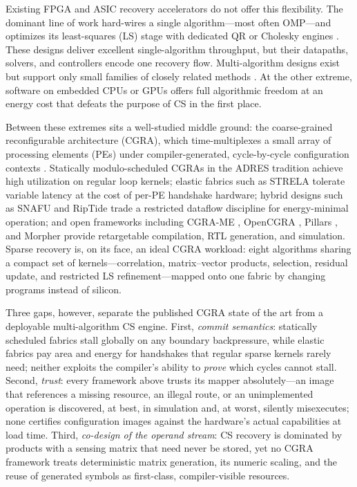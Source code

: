 Existing FPGA and ASIC recovery accelerators do not offer this flexibility.
The dominant line of work hard-wires a single algorithm---most often
OMP---and optimizes its least-squares (LS) stage with dedicated QR or
Cholesky engines \cite{ge2019qr_omp, roy2020ge_omp}. These designs deliver
excellent single-algorithm throughput, but their datapaths, solvers, and
controllers encode one recovery flow. Multi-algorithm designs exist but
support only small families of closely related methods \cite{bai2012omp_amp}.
At the other extreme, software on embedded CPUs or GPUs offers full
algorithmic freedom at an energy cost that defeats the purpose of CS in the
first place.

Between these extremes sits a well-studied middle ground: the coarse-grained
reconfigurable architecture (CGRA), which time-multiplexes a small array of
processing elements (PEs) under compiler-generated, cycle-by-cycle
configuration contexts \cite{liu2019cgra_survey}. Statically
modulo-scheduled CGRAs in the ADRES tradition \cite{mei2003adres} achieve
high utilization on regular loop kernels; elastic fabrics such as STRELA
\cite{strela2024} tolerate variable latency at the cost of per-PE handshake
hardware; hybrid designs such as SNAFU \cite{gobieski2021snafu} and RipTide
\cite{gobieski2022riptide} trade a restricted dataflow discipline for
energy-minimal operation; and open frameworks including CGRA-ME
\cite{ragheb2024cgrame2}, OpenCGRA \cite{tan2020opencgra}, Pillars
\cite{guo2020pillars}, and Morpher \cite{wijerathne2022morpher,
karunaratne2017hycube} provide retargetable compilation, RTL generation, and
simulation. Sparse recovery is, on its face, an ideal CGRA workload: eight
algorithms sharing a compact set of kernels---correlation, matrix--vector
products, selection, residual update, and restricted LS refinement---mapped
onto one fabric by changing programs instead of silicon.

Three gaps, however, separate the published CGRA state of the art from a
deployable multi-algorithm CS engine. First, \emph{commit semantics}:
statically scheduled fabrics stall globally on any boundary backpressure,
while elastic fabrics pay area and energy for handshakes that regular sparse
kernels rarely need; neither exploits the compiler's ability to \emph{prove}
which cycles cannot stall. Second, \emph{trust}: every framework above trusts
its mapper absolutely---an image that references a missing resource, an
illegal route, or an unimplemented operation is discovered, at best, in
simulation and, at worst, silently misexecutes; none certifies configuration
images against the hardware's actual capabilities at load time. Third,
\emph{co-design of the operand stream}: CS recovery is dominated by products
with a sensing matrix that need never be stored, yet no CGRA framework
treats deterministic matrix generation, its numeric scaling, and the reuse
of generated symbols as first-class, compiler-visible resources.

